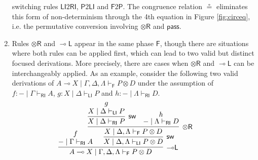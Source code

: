 \documentclass[submission,copyright,creativecommons]{eptcs}
\theoremstyle{definition}
\newcommand{\tr}{\otimes \mathsf{R}}
\newcommand{\lleft}{{\multimap}\mathsf{L}}
\newcommand{\pass}{\mathsf{pass}}
\newcommand{\ot}{\otimes}
\newcommand{\lolli}{\multimap}
\newcommand{\RI}{\mathsf{RI}}
\newcommand{\LI}{\mathsf{LI}}
\newcommand{\Pass}{\mathsf{P}}
\newcommand{\F}{\mathsf{F}}
\newcommand{\proofbox}[1]{\begin{tabular}{l} #1 \end{tabular}}
\begin{document}
\begin{enumerate}
  switching rules $\LI2\RI$, $\Pass2\LI$ and $\F2\Pass$.
  The congruence relation $\circeq$ eliminates this form of non-determinism through the 4th equation in Figure \ref{fig:circeq}, i.e. the permutative conversion involving $\tr$ and $\pass$.
  \item Rules $\tr$ and $\lleft$ appear in the same phase $\F$, though there are situations where both rules can be applied first, which can lead to two valid but distinct focused derivations. More precisely, there are cases when $\tr$ and $\lleft$ can be interchangeably applied. As an example, consider the following two valid derivations of $A \lolli X \mid \Gamma , \Delta , \Lambda \vdash_{\F} P \ot D$ under the assumption of $f : - \mid \Gamma \vdash_{\RI} A$, $g : X \mid \Delta \vdash_{\LI} P$ and $h : - \mid \Lambda \vdash_{\RI} D$.
    \begin{equation}\label{eq:llefttr}
      \hspace{-.5cm}
      \proofbox{
      \infer[\lleft]{A \lolli X \mid \Gamma , \Delta , \Lambda \vdash_{\F} P \ot D}{
        \deduce{- \mid \Gamma \vdash_{\RI} A}{f}
        &\hspace{-.6cm}
        \infer[\mathsf{sw}]{X \mid \Delta , \Lambda \vdash_{\LI} P \ot D}{
          \infer[\tr]{X \mid \Delta , \Lambda \vdash_{\F} P\ot D}{
            \infer[\mathsf{sw}]{X \mid \Delta \vdash_{\RI} P}{
              \deduce{X \mid \Delta \vdash_{\LI} P}{g}
            }
            &
            \deduce{- \mid \Lambda \vdash_{\RI} D}{h}
          }
        }
      }
      \hspace{.2cm}
}
\end{equation}
\end{enumerate}
\end{document}
